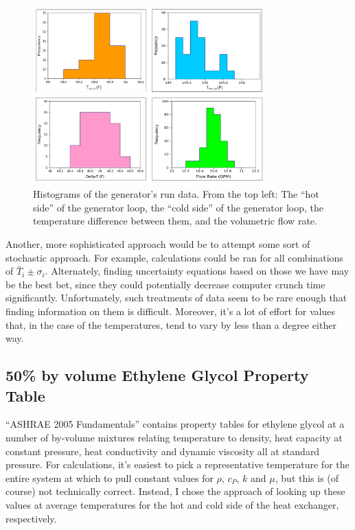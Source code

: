 \documentclass[12pt,letterpaper]{article}
\begin{document}
\begin{figure}[t]
\center
\label{fig:hists}
\includegraphics[width=0.8\textwidth]{histograms.png}
\caption{Histograms of the generator's run data. From the top left: The ``hot side'' of the generator loop, the ``cold side'' of the generator loop, the temperature difference between them, and the volumetric flow rate.}
\end{figure}

Another, more sophisticated approach would be to attempt some sort of stochastic approach. For example, calculations could be ran for all combinations of \(\bar{T}_i \pm \sigma_i\). Alternately, finding uncertainty equations based on those we have may be the best bet, since they could potentially decrease computer crunch time significantly. Unfortunately, such treatments of data seem to be rare enough that finding information on them is difficult. Moreover, it's a lot of effort for values that, in the case of the temperatures, tend to vary by less than a degree either way.

\subsection{50\% by volume Ethylene Glycol Property Table}

``ASHRAE 2005 Fundamentals'' contains property tables for ethylene glycol at a number of by-volume mixtures relating temperature to density, heat capacity at constant pressure, heat conductivity and dynamic viscosity all at standard pressure. For calculations, it's easiest to pick a representative temperature for the entire system at which to pull constant values for \(\rho\), \(c_P\), \(k\) and \(\mu\), but this is (of course) not technically correct. Instead, I chose the approach of looking up these values at average temperatures for the hot and cold side of the heat exchanger, respectively.
\end{document}

